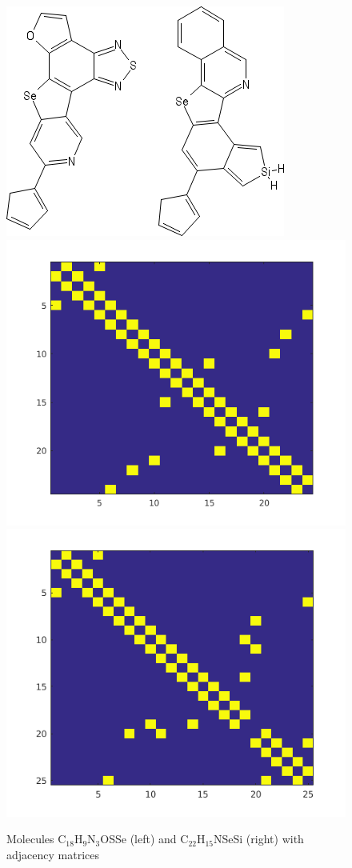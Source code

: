 \documentclass[sigchi]{acmart}
\theoremstyle{definition}
\theoremstyle{theorem}
\theoremstyle{corollary}
\theoremstyle{lemma}
\theoremstyle{remark}
\theoremstyle{prop}
\begin{document}
\begin{figure}
	\caption{\label{fig:HCEP-example} Molecules C$_{18}$H$_9$N$_3$OSSe (left) and C$_{22}$H$_{15}$NSeSi (right) with adjacency matrices}
	\centering
	\includegraphics[scale=0.3]{sketcher2} \\
	\includegraphics[scale=0.3]{adjacency1}
	\includegraphics[scale=0.3]{adjacency2}
\end{figure}
\end{document}
